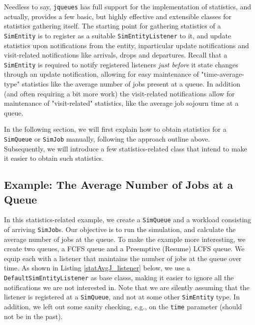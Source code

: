 \documentclass[12pt]{book}
\begin{document}
Needless to say, \lstinline|jqueues| has full support for the implementation of
  statistics, and actually, provides a few basic, but highly effective and extensible
  classes for statistics gathering itself.
The starting point for gathering statistics of a \lstinline|SimEntity|
  is to register as a suitable \lstinline|SimEntityListener| to it,
  and update statistics upon notifications from the entity,
  inparticular update notifications and
  visit-related notifications like arrivals, drops and departures.
Recall that a \lstinline|SimEntity| is required to notify registered listeners
  {\em just before\/} it state changes through an update notification,
  allowing for easy maintenance of "time-average-type" statistics
  like the average number of jobs present at a queue.
In addition (and often requiring a bit more work) the visit-related notifications
  allow for maintenance of "visit-related" statistics,
  like the average job sojourn time at a queue.

In the following section, we will first explain how to obtain statistics
  for a \lstinline|SimQueue| or \lstinline|SimJob| manually,
  following the approach outline above.
Subsequently,
  we will introduce a few statistics-related class
  that intend to make it easier to
  obtain such statistics.

\subsection{Example: The Average Number of Jobs at a Queue}
\label{stat-intro-avgJ}

In this statistics-related example,
  we create a \lstinline|SimQueue| and
  a workload consisting of arriving \lstinline|SimJob|s.
Our objective is to run the simulation,
  and calculate the average number of jobs at the queue.
To make the example more interesting, we create two queues,
  a FCFS queue and a Preemptive (Resume) LCFS queue.
We equip each with a listener that maintains the
  number of jobs at the queue over time.
As shown in Listing \ref{statAvgJ_listener} below,
  we use a \lstinline|DefaultSimEntityListener| as
  base classs,
  making it easier to ignore all the notifications
  we are not interested in.
Note that we are silently assuming that the listener
  is registered at a \lstinline|SimQueue|,
  and not at some other \lstinline|SimEntity| type.
In addition, we left out some sanity checking,
  e.g., on the \lstinline|time| parameter
  (should not be in the past).
\end{document}
